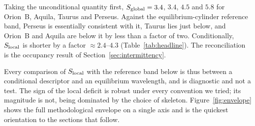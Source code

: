 \documentclass[usenatbib,twoside,twocolumn]{mnras}
\begin{document}
Taking the unconditional quantity first, $S_{\rm global}=3.4$, $3.4$, $4.5$ and $5.8$ for Orion~B, Aquila, Taurus and Perseus. Against the equilibrium-cylinder reference band, Perseus is essentially consistent with it, Taurus lies just below, and Orion~B and Aquila are below it by less than a factor of two. Conditionally, $S_{\rm local}$ is shorter by a factor $\approx2.4$--$4.3$ (Table~\ref{tab:headline}). The reconciliation is the occupancy result of Section~\ref{sec:intermittency}.

Every comparison of $S_{\rm local}$ with the reference band below is thus between a conditional descriptor and an equilibrium wavelength, and is diagnostic and not a test. The sign of the local deficit is robust under every convention we tried; its magnitude is not, being dominated by the choice of skeleton. Figure~\ref{fig:envelope} shows the full methodological envelope on a single axis and is the quickest orientation to the sections that follow.
\end{document}

